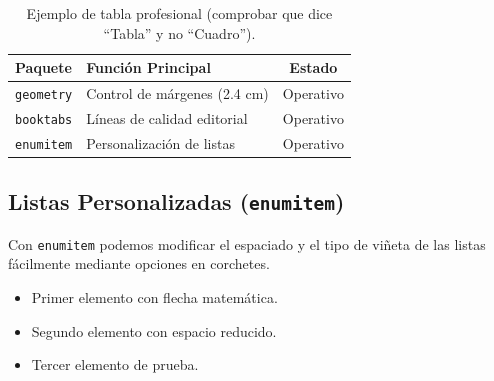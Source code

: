 \documentclass{article}
\begin{document}
\begin{table}[h]
    \centering
    \caption{Ejemplo de tabla profesional (comprobar que dice ``Tabla'' y no ``Cuadro'').}
    \vspace{0.3cm}
    \begin{tabular}{p{3cm} m{4cm} c}
        \toprule
        \textbf{Paquete} & \textbf{Función Principal} & \textbf{Estado} \\
        \midrule
        \texttt{geometry} & Control de márgenes (2.4 cm) & Operativo \\
        \texttt{booktabs} & Líneas de calidad editorial & Operativo \\
        \texttt{enumitem} & Personalización de listas & Operativo \\
        \bottomrule
    \end{tabular}
    \label{tab:ejemplo}
\end{table}

\subsection{Listas Personalizadas (\texttt{enumitem})}
Con \texttt{enumitem} podemos modificar el espaciado y el tipo de viñeta de las listas fácilmente mediante opciones en corchetes.

\begin{itemize}[label=$\rightarrow$, noitemsep]
    \item Primer elemento con flecha matemática.
    \item Segundo elemento con espacio reducido.
    \item Tercer elemento de prueba.
\end{itemize}
\end{document}
